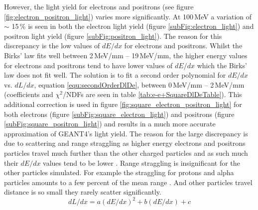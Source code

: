 However, the light yield for electrons and positrons (see figure \ref{fig:electron_positron_light}) varies more significantly. At 100\,MeV a variation of $\sim$ 15\,\% is seen in both the electron light yield (figure \ref{subFig:electron_light}) and positron light yield (figure \ref{subFig:positron_light}). The reason for this discrepancy is the low values of $dE/dx$ for electrons and positrons. Whilst the Birks' law fits well between 2\,MeV/mm -- 19\,MeV/mm, the higher energy values for electrons and positrons tend to have lower values of $dE/dx$ which the Birks' law does not fit well. The solution is to fit a second order polynomial for $dE/dx$ vs. $dL/dx$, equation \ref{equ:secondOrderDlDe}, between 0\,MeV/mm -- 2\,MeV/mm (coefficients and $\chi^2$/NDFs are seen in table \ref{tab:e-e+SquareDlDeTable}). This additional correction is used in figure \ref{fig:square_electron_positron_light} for both electrons (figure \ref{subFig:square_electron_light}) and positrons (figure \ref{subFig:square_positron_light}) and results in a much more accurate approximation of GEANT4's light yield. The reason for the large discrepancy is due to scattering and range straggling as higher energy electrons and positrons particles travel much further than the other charged particles and as such much their $dE/dx$ values tend to be lower \cite{knoll_2010}. Range straggling is insignificant for the other particles simulated. For example the straggling for protons and alpha particles amounts to a few percent of the mean range \cite{knoll_2010}. And other particles travel distance is so small they rarely scatter significantly. 
\begin{equation}
    dL/dx = a(dE/dx)^2 + b(dE/dx) + c
    \label{equ:secondOrderDlDe}
\end{equation}
